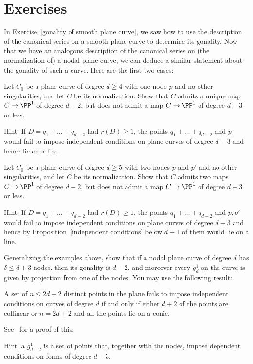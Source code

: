 \section{Exercises}

In Exercise~\ref{gonality of smooth plane curve}, we saw how to use the description of the canonical series on a smooth plane curve to determine its gonality. Now that we have an analogous description of the canonical series on (the normalization of) a nodal plane curve, we can deduce a similar statement about the gonality of such a curve. Here are the first two cases: 

\begin{exercise}
Let $C_0$ be a plane curve of degree $d\geq 4$ with one node $p$ and no other singularities, and let $C$ be its normalization. Show that $C$ admits a unique map $C \to \PP^1$ of degree $d-2$, but does not admit a map $C \to \PP^1$ of degree $d-3$ or less.

Hint: If $D = q_1 + \dots + q_{d-2}$ had $r(D) \geq 1$, the points $q_1 + \dots + q_{d-2}$ and $p$ would fail to impose independent conditions on plane curves of degree $d-3$ and hence lie on a line.
\end{exercise}

\begin{exercise}
Let $C_0$ be a plane curve of degree $d\geq 5$ with two nodes $p$ and $p'$ and no other singularities, and let $C$ be its normalization. Show that $C$ admits two maps $C \to \PP^1$ of degree $d-2$, but does not admit a map $C \to \PP^1$ of degree $d-3$ or less.

Hint: If $D = q_1 + \dots + q_{d-2}$ had $r(D) \geq 1$, the points $q_1 + \dots + q_{d-2}$ and $p, p'$ would fail to impose independent conditions on plane curves of degree $d-3$ and hence by Proposition~\ref{independent conditions} below $d-1$ of them would lie on a line.
\end{exercise}

\begin{exercise}
Generalizing the examples above, show that if a nodal plane curve of degree $d$ has $\delta\leq d+3$ nodes,
then its gonality is $d-2$, and moreover every $g^1_d$ on the curve is given by projection from one of the nodes.
You may use the following result:
\begin{proposition}\label{independent conditions}
 A set of $n \leq 2d+ 2$ distinct
points in the plane fails to impose independent conditions on curves of degree
$d$ if and only if either $d + 2$ of the points  are collinear or $n = 2d + 2$ and all the points lie
on a conic.
\end{proposition} 
See~\cite[p. 302]{MR1376653} for a proof of this.

Hint: a $g^1_{d-2}$ is a set of points that, together with the nodes, impose dependent conditions on forms of degree $d-3$.
\end{exercise}

